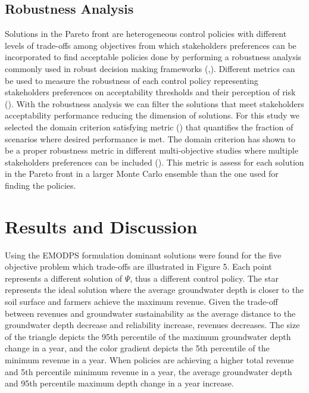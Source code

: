 \documentclass[11pt,a4paper]{article}
\begin{document}
\subsection{Robustness Analysis}

Solutions in the Pareto front are heterogeneous control policies with different levels of trade-offs among objectives from which stakeholders preferences can be incorporated to find acceptable policies done by performing a robustness analysis commonly used in robust decision making frameworks (\cite{lempert_making_2013},\cite{kasprzyk_many_2013}). Different metrics can be used to measure the robustness of each control policy representing stakeholders preferences on acceptability thresholds and their perception of risk (\cite{mcphail_robustness_2018}).  With the robustness analysis we can filter the solutions that meet stakeholders acceptability performance reducing the dimension of solutions. For this study we selected the domain criterion satisfying metric (\cite{starr_product_1963}) that quantifies the fraction of scenarios where desired performance is met. The domain criterion has shown to be a proper robustness metric in different multi-objective studies where multiple stakeholders preferences can be included (\cite{herman_how_2015}). This metric is assess for each solution in the Pareto front in a larger Monte Carlo ensemble than the one used for finding the policies. 


\section{Results and Discussion}

Using the EMODPS formulation dominant solutions were found for the five objective problem which trade-offs are illustrated in Figure 5. Each point represents a different solution of $\Psi$, thus a different control policy. The star represents the ideal solution where the average groundwater depth is closer to the soil surface and farmers achieve the maximum revenue. Given the trade-off between revenues and groundwater sustainability as the average distance to the groundwater depth decrease and reliability increase, revenues decreases. The size of the triangle depicts the 95th percentile of the maximum groundwater depth change in a year, and the color gradient depicts the 5th percentile of the minimum revenue in a year. When policies are achieving a higher total revenue and 5th percentile minimum revenue in a year, the average groundwater depth and 95th percentile maximum depth change in a year increase. 
\end{document}
